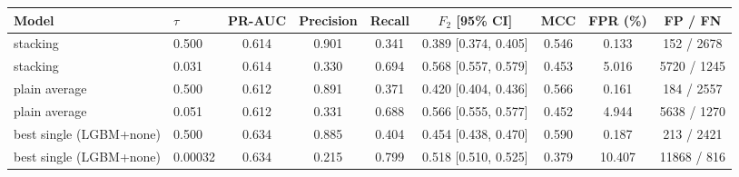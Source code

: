 \begin{tabular}{llccccccc}
\hline
Model & $\tau$ & PR-AUC & Precision & Recall & $F_2$ [95\% CI] & MCC & FPR (\%) & FP / FN \\
\hline
stacking & 0.500 & 0.614 & 0.901 & 0.341 & 0.389 [0.374, 0.405] & 0.546 & 0.133 & 152 / 2678 \\
stacking & 0.031 & 0.614 & 0.330 & 0.694 & 0.568 [0.557, 0.579] & 0.453 & 5.016 & 5720 / 1245 \\
plain average & 0.500 & 0.612 & 0.891 & 0.371 & 0.420 [0.404, 0.436] & 0.566 & 0.161 & 184 / 2557 \\
plain average & 0.051 & 0.612 & 0.331 & 0.688 & 0.566 [0.555, 0.577] & 0.452 & 4.944 & 5638 / 1270 \\
best single (LGBM+none) & 0.500 & 0.634 & 0.885 & 0.404 & 0.454 [0.438, 0.470] & 0.590 & 0.187 & 213 / 2421 \\
best single (LGBM+none) & 0.00032 & 0.634 & 0.215 & 0.799 & 0.518 [0.510, 0.525] & 0.379 & 10.407 & 11868 / 816 \\
\hline
\end{tabular}
